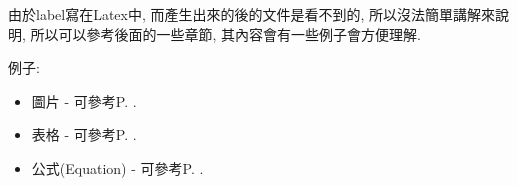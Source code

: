   \EmptyLine
由於label寫在Latex中, 而產生出來的後的文件是看不到的, 所以沒法簡單講解來說明, 所以可以參考後面的一些章節, 其內容會有一些例子會方便理解.

例子:
\begin{itemize}
  \item 圖片 - 可參考P. .

  \item 表格 - 可參考P. .

  \item 公式(Equation) - 可參考P. .
\end{itemize}


